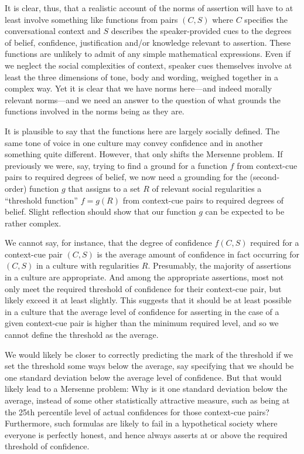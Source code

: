 It is clear, thus, that a realistic account of the norms of assertion will have to at least involve something like functions from pairs $(C,S)$ 
where $C$ specifies the conversational context and $S$ describes the speaker-provided cues to the degrees of belief, confidence, justification 
and/or knowledge relevant to assertion. These functions are unlikely to admit of any simple mathematical expressions.
Even if we neglect the social complexities of context, speaker cues themselves involve at least the three dimensions of 
tone, body and wording, weighed together in a complex way. Yet it is clear that we have norms here---and indeed morally relevant norms---and we need an 
answer to the question of what grounds the functions involved in the norms being as they are.

It is plausible to say that the functions here are largely socially defined. The same tone of voice in one culture may 
convey confidence and in another something quite different. However, that only shifts the Mersenne problem. If previously
we were, say, trying to find a ground for a function $f$ from context-cue pairs to required degrees of belief, we now need
a grounding for the (second-order) function $g$ that assigns to a set $R$ of relevant social regularities a ``threshold function'' $f=g(R)$ 
from context-cue pairs to required degrees of belief. Slight reflection should show that our function $g$ can be expected to 
be rather complex. 

We cannot say, for instance, that the degree of confidence $f(C,S)$ required for a context-cue pair $(C,S)$ 
is the average amount of confidence in fact occurring for $(C,S)$ in a culture with regularities $R$. Presumably,
the majority of assertions in a culture are appropriate. And among the appropriate assertions, most not only meet
the required threshold of confidence for their context-cue pair, but likely exceed it at least slightly. This 
suggests that it should be at least possible in a culture that the average level of confidence for asserting in 
the case of a given context-cue pair is higher than the minimum required level, and so we cannot define the 
threshold as the average. 

We would likely be closer to correctly predicting the mark of the threshold if we set the threshold some ways below
the average, say specifying that we should be one standard deviation below the 
average level of confidence. But that would likely lead to a Mersenne problem: Why is it one standard deviation below 
the average, instead of some other statistically attractive measure, such as being at the 25th percentile level of 
actual confidences for those context-cue pairs? Furthermore, such formulas are likely to fail in a hypothetical 
society where everyone is perfectly honest, and hence always asserts at or above the required threshold of confidence.

